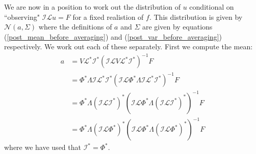 We are now in a position to work out the distribution of $u$ conditional on ``observing" $\mathcal{I}\mathcal{L}u=F$ for a fixed realistion of $f$. This distribution is given by $\mathcal{N}(a,\Sigma)$ where the definitions of $a$ and $\Sigma$ are given by equations (\ref{post_mean_before_averaging}) and (\ref{post_var_before_averaging}) respectively. We work out each of these separately. First we compute the mean:
\begin{align*}
    a &= V\mathcal{L}^{*}\mathcal{I}^{*}(\mathcal{I}\mathcal{L}V\mathcal{L}^{*}\mathcal{I}^{*})^{-1}F \\
    &= \Phi^{*}\Lambda\mathcal{I}\mathcal{L}^{*}\mathcal{I}^{*}(\mathcal{I}\mathcal{L}\Phi^{*}\Lambda\mathcal{I}\mathcal{L}^{*}\mathcal{I}^{*})^{-1}F \\
    &=\Phi^{*}\Lambda(\mathcal{I}\mathcal{L}\mathcal{I}^{*})^{*}(\mathcal{I}\mathcal{L}\Phi^{*}\Lambda(\mathcal{I}\mathcal{L}\mathcal{I}^{*})^{*})^{-1}F \\
    &=\Phi^{*}\Lambda(\mathcal{I}\mathcal{L}\Phi^{*})^{*}(\mathcal{I}\mathcal{L}\Phi^{*}\Lambda(\mathcal{I}\mathcal{L}\Phi^{*})^{*})^{-1}F
\end{align*}
where we have used that $\mathcal{I}^{*}=\Phi^{*}$.

